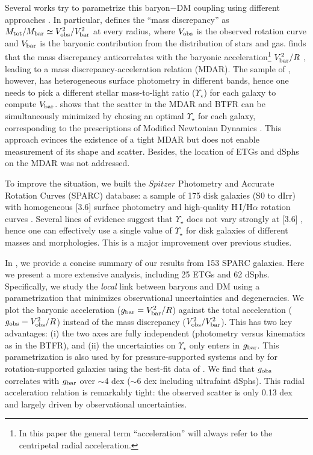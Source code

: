 \documentclass[apjl, twocolappendix]{emulateapj}
\newcommand{\hiA} {{\rm H}\,{\small\rm I}}
\begin{document}
Several works try to parametrize this baryon$-$DM coupling using different approaches \citep{Sanders1990, Persic1991, McGaugh1999, McGaugh2004, McGaugh2014, Swaters2009, Swaters2014, Lelli2013, Lelli2016b, Walker2014}. In particular, \citet{McGaugh2004} defines the ``mass discrepancy'' as $M_{\rm tot}/M_{\rm bar} \simeq V_{\rm obs}^{2}/V_{\rm bar}^{2}$ at every radius, where $V_{\rm obs}$ is the observed rotation curve and $V_{\rm bar}$ is the baryonic contribution from the distribution of stars and gas. \citet{McGaugh2004} finds that the mass discrepancy anticorrelates with the baryonic acceleration\footnote{In this paper the general term ``acceleration'' will always refer to the centripetal radial acceleration.} $V_{\rm bar}^{2}/R$ \citep[see also][]{Sanders1990}, leading to a mass discrepancy-acceleration relation (MDAR). The sample of \citet{McGaugh2004}, however, has heterogeneous surface photometry in different bands, hence one needs to pick a different stellar mass-to-light ratio ($\Upsilon_{\star}$) for each galaxy to compute $V_{\rm bar}$. \citet{McGaugh2004} shows that the scatter in the MDAR and BTFR can be simultaneously minimized by chosing an optimal $\Upsilon_{\star}$ for each galaxy, corresponding to the prescriptions of Modified Newtonian Dynamics \citep[MOND;][]{Milgrom1983}. This approach evinces the existence of a tight MDAR but does not enable measurement of its shape and scatter. Besides, the location of ETGs and dSphs on the MDAR was not addressed.

To improve the situation, we built the $Spitzer$ Photometry and Accurate Rotation Curves (SPARC) database: a sample of 175 disk galaxies (S0 to dIrr) with homogeneous [3.6] surface photometry and high-quality \hiA/H$\alpha$ rotation curves \citep[][hereafter Paper I]{Lelli2016b}. Several lines of evidence suggest that $\Upsilon_{\star}$ does not vary strongly at [3.6] \citep{McGaugh2014b, McGaugh2015, Meidt2014, Schombert2014a}, hence one can effectively use a single value of $\Upsilon_{\star}$ for disk galaxies of different masses and morphologies. This is a major improvement over previous studies. 

In \citet{McGaugh2016}, we provide a concise summary of our results from 153 SPARC galaxies. Here we present a more extensive analysis, including 25 ETGs and 62 dSphs. Specifically, we study the \textit{local} link between baryons and DM using a parametrization that minimizes observational uncertainties and degeneracies. We plot the baryonic acceleration ($g_{\rm bar} = V_{\rm bar}^2/R$) against the total acceleration ($g_{\rm obs} = V_{\rm obs}^2/R$) instead of the mass discrepancy ($V_{\rm obs}^{2}/V_{\rm bar}^{2}$). This has two key advantages: (i) the two axes are fully independent (photometry versus kinematics as in the BTFR), and (ii) the uncertainties on $\Upsilon_{\star}$ only enters in $g_{\rm bar}$. This parametrization is also used by \citet{Scarpa2006} for pressure-supported systems and by \citet{Wu2015} for rotation-supported galaxies using the best-fit data of \citet{McGaugh2004}. We find that $g_{\rm obs}$ correlates with $g_{\rm bar}$ over $\sim$4 dex ($\sim$6 dex including ultrafaint dSphs). This radial acceleration relation is remarkably tight: the observed scatter is only 0.13 dex and largely driven by observational uncertainties.
\end{document}
